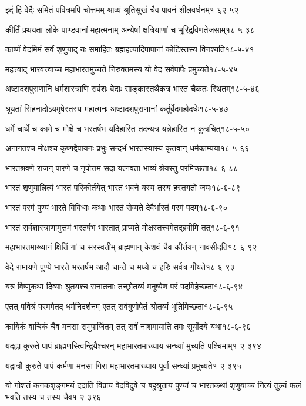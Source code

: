 \annotwolineshloka
{इदं हि वेदैः समितं पवित्रमपि चोत्तमम्}
{श्राव्यं श्रुतिसुखं चैव पावनं शीलवर्धनम्}{१-६२-५२}


\annotwolineshloka
{कीर्तिं प्रथयता लोके पाण्डवानां महात्मनाम्}
{अन्येषां क्षत्रियाणां च भूरिद्रविणतेजसाम्}{१८-५-३८}

\annotwolineshloka
{कार्ष्णं वेदमिमं सर्वं शृणुयाद् यः समाहितः}
{ब्रह्महत्यादिपापानां कोटिस्तस्य विनश्यति}{१८-५-४१}

\annotwolineshloka
{महत्त्वाद् भारवत्त्वाच्च महाभारतमुच्यते}
{निरुक्तमस्य यो वेद सर्वपापैः प्रमुच्यते}{१८-५-४५}

\annotwolineshloka
{अष्टादशपुराणानि धर्मशास्त्राणि सर्वशः}
{वेदाः साङ्कास्तथैकत्र भारतं चैकतः स्थितम्}{१८-५-४६}

\annotwolineshloka
{श्रूयतां सिंहनादोऽयमृषेस्तस्य महात्मनः}
{अष्टादशपुराणानां कर्तुर्वेदमहोदधेः}{१८-५-४७}

\annotwolineshloka
{धर्मे चार्थे च कामे च मोक्षे च भरतर्षभ}
{यदिहास्ति तदन्यत्र यन्नेहास्ति न कुत्रचित्}{१८-५-५०}

\annotwolineshloka
{अनागतश्च मोक्षश्च कृष्णद्वैपायनः प्रभुः}
{सन्दर्भं भारतस्यास्य कृतवान् धर्मकाम्यया}{१८-५-६६}

\annotwolineshloka
{भारतश्रवणे राजन् पारणे च नृपोत्तम}
{सदा यत्नवता भाव्यं श्रेयस्तु परमिच्छता}{१८-६-८८}

\annotwolineshloka
{भारतं शृणुयान्नित्यं भारतं परिकीर्तयेत्}
{भारतं भवने यस्य तस्य हस्तगतो जयः}{१८-६-८९}

\annotwolineshloka
{भारतं परमं पुण्यं भारते विविधाः कथाः}
{भारतं सेव्यते देवैर्भारतं परमं पदम्}{१८-६-९०}

\annotwolineshloka
{भारतं सर्वशास्त्राणामुत्तमं भरतर्षभ}
{भारतात् प्राप्यते मोक्षस्तत्त्वमेतद्ब्रवीमि तत्}{१८-६-९१}

\annotwolineshloka
{महाभारतमाख्यानं क्षितिं गां च सरस्वतीम्}
{ब्राह्मणान् केशवं चैव कीर्तयन् नावसीदति}{१८-६-९२}

\annotwolineshloka
{वेदे रामायणे पुण्ये भारते भरतर्षभ}
{आदौ चान्ते च मध्ये च हरिः सर्वत्र गीयते}{१८-६-९३}

\annotwolineshloka
{यत्र विष्णुकथा दिव्याः श्रुतयश्च सनातनाः}
{तच्छ्रोतव्यं मनुष्येण परं पदमिहेच्छता}{१८-६-९४}

\annotwolineshloka
{एतत् पवित्रं परममेतद् धर्मनिदर्शनम्}
{एतत् सर्वगुणोपेतं श्रोतव्यं भूतिमिच्छता}{१८-६-९५}

\annotwolineshloka
{कायिकं वाचिकं चैव मनसा समुपार्जितम्}
{तत् सर्वं नाशमायाति तमः सूर्योदये यथा}{१८-६-९६}

\annotwolineshloka
{यदह्ना कुरुते पापं ब्राह्मणस्त्विन्द्रियैश्चरन्}
{महाभारतमाख्याय सन्ध्यां मुच्यति पश्चिमाम्}{१-२-३९४}

\annotwolineshloka
{यद्रात्रौ कुरुते पापं कर्मणा मनसा गिरा}
{महाभारतमाख्याय पूर्वां सन्ध्यां प्रमुच्यते}{१-२-३९५}

\annofourlineindentedshloka
{यो गोशतं कनकशृङ्गमयं ददाति}
{विप्राय वेदविदुषे च बहुश्रुताय}
{पुण्यां च भारतकथां शृणुयाच्च नित्यं}
{तुल्यं फलं भवति तस्य च तस्य चैव}{१-२-३९६}
